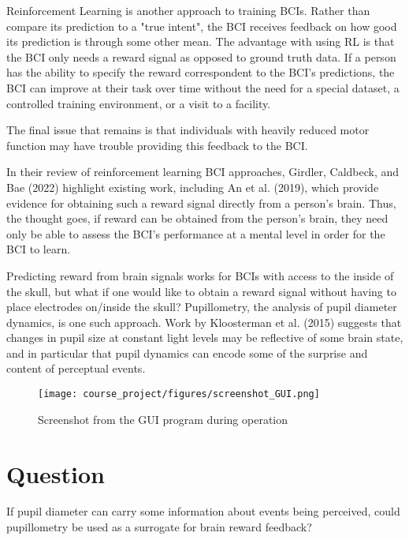 \documentclass[10pt,letterpaper]{article}
\begin{document}
Reinforcement Learning is another approach to training BCIs. Rather than compare its prediction to a "true intent", the BCI receives feedback on how good its prediction is through some other mean. The advantage with using RL is that the BCI only needs a reward signal as opposed to ground truth data. If a person has the ability to specify the reward correspondent to the BCI's predictions, the BCI can improve at their task over time without the need for a special dataset, a controlled training environment, or a visit to a facility.

The final issue that remains is that individuals with heavily reduced motor function may have trouble providing this feedback to the BCI.

In their review of reinforcement learning BCI approaches, Girdler, Caldbeck, and Bae (2022) highlight existing work, including An et al. (2019), which provide evidence for obtaining such a reward signal directly from a person's brain. Thus, the thought goes, if reward can be obtained from the person's brain, they need only be able to assess the BCI's performance at a mental level in order for the BCI to learn.

Predicting reward from brain signals works for BCIs with access to the inside of the skull, but what if one would like to obtain a reward signal without having to place electrodes on/inside the skull? Pupillometry, the analysis of pupil diameter dynamics, is one such approach. Work by Kloosterman et al. (2015) suggests that changes in pupil size at constant light levels may be reflective of some brain state, and in particular that pupil dynamics can encode some of the surprise and content of perceptual events.

\begin{figure*}[h]
    \centering
    \texttt{[image: course\_project/figures/screenshot\_GUI.png]}
    \caption{Screenshot from the GUI program during operation}
    \label{fig:enter-label}
\end{figure*}

\section{Question}
If pupil diameter can carry some information about events being perceived, could pupillometry be used as a surrogate for brain reward feedback?


\end{document}
